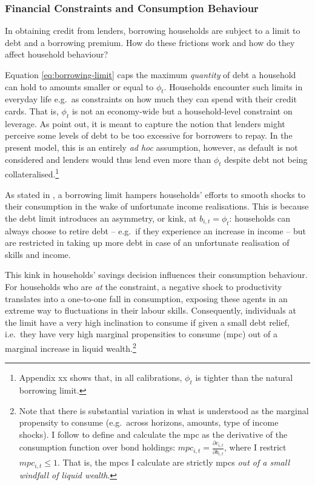 \documentclass[a4paper,12pt]{article} %
\numberwithin{equation}{section} %
\numberwithin{figure}{section}
\numberwithin{table}{section}
\begin{document}
\subsubsection{Financial Constraints and Consumption Behaviour}
\label{sec:model-hh-constraints}

In obtaining credit from lenders, borrowing households are subject to a limit to debt and a borrowing premium. How do these frictions work and how do they affect household behaviour?

Equation \eqref{eq:borrowing-limit} caps the maximum \textit{quantity} of debt a household can hold to amounts smaller or equal to $\phi_t$. Households encounter such limits in everyday life e.g.~as constraints on how much they can spend with their credit cards. That is, $\phi_t$ is not an economy-wide but a household-level constraint on leverage. As \textcite{egg2012} point out, it is meant to capture the notion that lenders might perceive some levels of debt to be too excessive for borrowers to repay. In the present model, this is an entirely \textit{ad hoc} assumption, however, as default is not considered and lenders would thus lend even more than $\phi_t$ despite debt not being collateralised.\footnote{Appendix xx shows that, in all calibrations, $\phi_t$ is tighter than the natural borrowing limit.}

As stated in \textcite{carroll2021}, a borrowing limit hampers households' efforts to smooth shocks to their consumption in the wake of unfortunate income realisations. This is because the debt limit introduces an asymmetry, or kink, at $b_{i,t} = \phi_t$: households can always choose to retire debt -- e.g.~if they experience an increase in income -- but are restricted in taking up more debt in case of an unfortunate realisation of skills and income. 

This kink in households' savings decision influences their consumption behaviour. For households who are \textit{at} the constraint, a negative shock to productivity translates into a one-to-one fall in consumption, exposing these agents in an extreme way to fluctuations in their labour skills. Consequently, individuals at the limit have a very high inclination to consume if given a small debt relief, i.e.~they have very high marginal propensities to consume (\Gls{mpc}) out of a marginal increase in liquid wealth.\footnote{Note that there is substantial variation in what is understood as the marginal propensity to consume (e.g.~across horizons, amounts, type of income shocks). I follow \textcite{gl2017} to define and calculate the \Gls{mpc} as the derivative of the consumption function over bond holdings: $mpc_{i,t} = \frac{\partial c_{i,t}}{\partial b_{i,t}}$, where I restrict $mpc_{i,t} \le 1$. That is, the \Gls{mpc}s I calculate are strictly \Gls{mpc}s \textit{out of a small windfall of liquid wealth}.}
\end{document}
